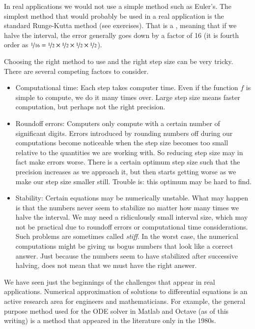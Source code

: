 \documentclass[12pt]{book}
\begin{document}
\medskip

In real applications we would not use a simple method such as Euler's.  The
simplest method that would probably be used in a real application is the
standard Runge-Kutta method (see exercises).  That is a
,
meaning that if we halve the interval, the error generally
goes down by a factor of 16 (it is fourth order as $\nicefrac{1}{16} =
\nicefrac{1}{2} \times \nicefrac{1}{2}
\times \nicefrac{1}{2} \times \nicefrac{1}{2}$).

Choosing the right method to use and the right step size can be very tricky.
There are several competing factors to consider.
\begin{itemize}
\item Computational time:  Each step takes computer time.  Even if the
function $f$ is simple to compute, we do it many times over.
Large step size means faster computation, but perhaps not
the right precision.
\item Roundoff errors: Computers only compute with a certain number of
significant digits.  Errors introduced by rounding numbers off during our
computations become noticeable when the step size becomes
too small relative to the quantities we are working with.
So reducing
step size may in fact make errors worse.
There is a certain optimum step size
such that the precision increases as we approach it, but then starts getting
worse as we make our step size
smaller still.  Trouble is: this optimum may be hard to find.
\item Stability: Certain equations may be numerically unstable.  What may
happen is that the numbers never seem to stabilize no matter how many times
we halve the interval.  We may need a ridiculously small interval size,
which may not be practical due to roundoff errors or computational time
considerations.  Such problems are sometimes called
\emph{stiff}.
In the worst case, the numerical computations might be
giving us bogus numbers that look like a correct answer.  Just because the
numbers seem to have stabilized after successive halving, does not mean that we must
have the right answer.
\end{itemize}

We have seen just the beginnings of the challenges that appear in real
applications.  Numerical approximation of solutions to differential
equations is an active research area for engineers and mathematicians.  For
example, the general purpose method used for the ODE solver in Matlab and
Octave (as of this writing) is a method that appeared in the literature only
in the 1980s.
\end{document}
